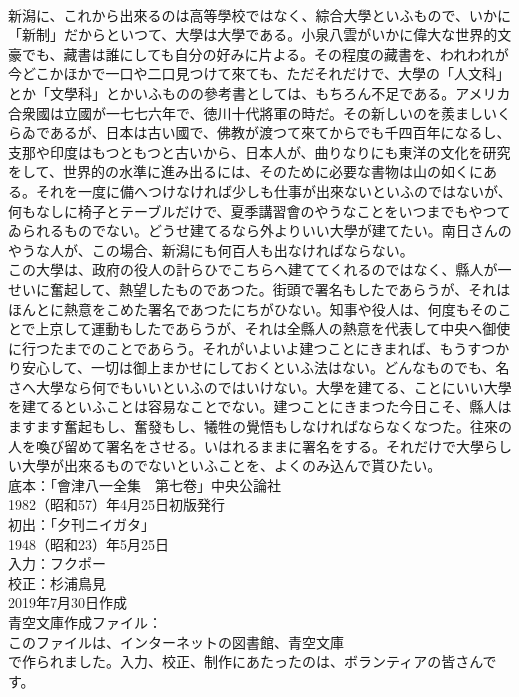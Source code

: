 \documentclass[8pt]{extreport}
\begin{document}
\begin{CJK}{UTF8}{min}
\\	新潟に、これから出來るのは高等學校ではなく、綜合大學といふもので、いかに「新制」だからといつて、大學は大學である。小泉八雲がいかに偉大な世界的文豪でも、藏書は誰にしても自分の好みに片よる。その程度の藏書を、われわれが今どこかほかで一口や二口見つけて來ても、ただそれだけで、大學の「人文科」とか「文學科」とかいふものの參考書としては、もちろん不足である。アメリカ合衆國は立國が一七七六年で、徳川十代將軍の時だ。その新しいのを羨ましいくらゐであるが、日本は古い國で、佛教が渡つて來てからでも千四百年になるし、支那や印度はもつともつと古いから、日本人が、曲りなりにも東洋の文化を研究をして、世界的の水準に進み出るには、そのために必要な書物は山の如くにある。それを一度に備へつけなければ少しも仕事が出來ないといふのではないが、何もなしに椅子とテーブルだけで、夏季講習會のやうなことをいつまでもやつてゐられるものでない。どうせ建てるなら外よりいい大學が建てたい。南日さんのやうな人が、この場合、新潟にも何百人も出なければならない。
\\	この大學は、政府の役人の計らひでこちらへ建ててくれるのではなく、縣人が一せいに奮起して、熱望したものであつた。街頭で署名もしたであらうが、それはほんとに熱意をこめた署名であつたにちがひない。知事や役人は、何度もそのことで上京して運動もしたであらうが、それは全縣人の熱意を代表して中央へ御使に行つたまでのことであらう。それがいよいよ建つことにきまれば、もうすつかり安心して、一切は御上まかせにしておくといふ法はない。どんなものでも、名さへ大學なら何でもいいといふのではいけない。大學を建てる、ことにいい大學を建てるといふことは容易なことでない。建つことにきまつた今日こそ、縣人はますます奮起もし、奮發もし、犧牲の覺悟もしなければならなくなつた。往來の人を喚び留めて署名をさせる。いはれるままに署名をする。それだけで大學らしい大學が出來るものでないといふことを、よくのみ込んで貰ひたい。
\\	底本：「會津八一全集　第七卷」中央公論社
\\	1982（昭和57）年4月25日初版発行
\\	初出：「夕刊ニイガタ」
\\	1948（昭和23）年5月25日
\\	入力：フクポー
\\	校正：杉浦鳥見
\\	2019年7月30日作成
\\	青空文庫作成ファイル：
\\	このファイルは、インターネットの図書館、青空文庫
\\	で作られました。入力、校正、制作にあたったのは、ボランティアの皆さんです。
\end{CJK}
\end{document}

